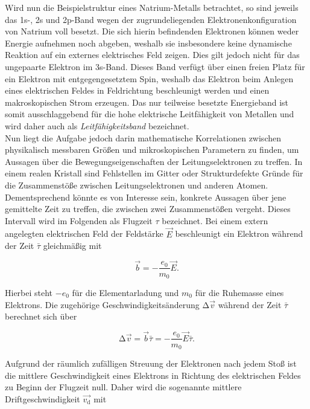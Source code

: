 \noindent Wird nun die Beispielstruktur eines Natrium-Metalls betrachtet, so sind jeweils das 1s-, 2s und 2p-Band wegen der 
zugrundeliegenden Elektronenkonfiguration von Natrium voll besetzt. Die sich hierin befindenden Elektronen können weder 
Energie aufnehmen noch abgeben, weshalb sie insbesondere keine dynamische Reaktion auf ein externes elektrisches Feld zeigen.
Dies gilt jedoch nicht für das ungepaarte Elektron im 3s-Band. Dieses Band verfügt über einen freien Platz für ein Elektron 
mit entgegengesetztem Spin, weshalb das Elektron beim Anlegen eines elektrischen Feldes in Feldrichtung beschleunigt werden 
und einen makroskopischen Strom erzeugen. Das nur teilweise besetzte Energieband ist somit ausschlaggebend für die hohe 
elektrische Leitfähigkeit von Metallen und wird daher auch als \emph{Leitfähigkeitsband} bezeichnet.\\

\noindent Nun liegt die Aufgabe jedoch darin mathematische Korrelationen zwischen physikalisch messbaren Größen und mikroskopischen 
Parametern zu finden, um Aussagen über die Bewegungseigenschaften der Leitungselektronen zu treffen. In einem realen Kristall 
sind Fehlstellen im Gitter oder Strukturdefekte Gründe für die Zusammenstöße zwischen Leitungselektronen und anderen Atomen.
Dementsprechend könnte es von Interesse sein, konkrete Aussagen über jene gemittelte Zeit zu treffen, die zwischen zwei 
Zusammenstößen vergeht. Dieses Intervall wird im Folgenden als Flugzeit $\tau$ bezeichnet. Bei einem extern angelegten elektrischen 
Feld der Feldstärke $\vec{E}$ beschleunigt ein Elektron während der Zeit $\bar{\tau}$ gleichmäßig mit 

\begin{equation*}
    \vec{b} = -\frac{e_0}{m_0}\vec{E}.
\end{equation*}

\noindent Hierbei steht $-e_0$ für die Elementarladung und $m_0$ für die Ruhemasse eines Elektrons. Die zugehörige
Geschwindigkeitsänderung $\increment{}\vec{v}$ während der Zeit $\bar{\tau}$ berechnet sich über 

\begin{equation}
\label{eqn:velocity}
    \increment{}\vec{v} = \vec{b}\bar{\tau} = -\frac{e_0}{m_0}\vec{E}\bar{\tau}.
\end{equation}

\noindent Aufgrund der räumlich zufälligen Streuung der Elektronen nach jedem Stoß ist die mittlere Geschwindigkeit 
eines Elektrons in Richtung des elektrischen Feldes zu Beginn der Flugzeit null. Daher wird die sogenannte mittlere 
Driftgeschwindigkeit $\vec{v_\text{d}}$ mit 

